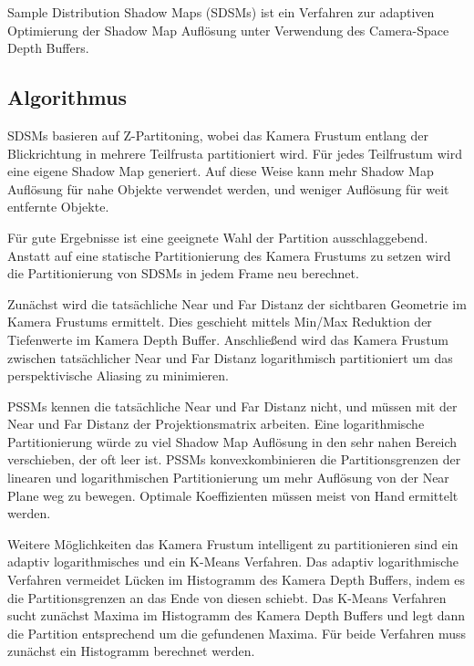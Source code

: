 \documentclass[runningheaders,a4paper]{llncs}
\begin{document}
Sample Distribution Shadow Maps (SDSMs) ist ein Verfahren zur adaptiven Optimierung der Shadow Map Auflösung unter Verwendung des Camera-Space Depth Buffers.

\subsection{Algorithmus}

SDSMs basieren auf Z-Partitoning, wobei das Kamera Frustum entlang der Blickrichtung in mehrere Teilfrusta partitioniert wird. Für jedes Teilfrustum wird eine eigene Shadow Map generiert.
Auf diese Weise kann mehr Shadow Map Auflösung für nahe Objekte verwendet werden, und weniger Auflösung für weit entfernte Objekte.

Für gute Ergebnisse ist eine geeignete Wahl der Partition ausschlaggebend.
Anstatt auf eine statische Partitionierung des Kamera Frustums zu setzen wird die Partitionierung von SDSMs in jedem Frame neu berechnet.

Zunächst wird die tatsächliche Near und Far Distanz der sichtbaren Geometrie im Kamera Frustums ermittelt. Dies geschieht mittels Min/Max Reduktion der Tiefenwerte im Kamera Depth Buffer.
Anschließend wird das Kamera Frustum zwischen tatsächlicher Near und Far Distanz logarithmisch partitioniert um das perspektivische Aliasing zu minimieren.

PSSMs kennen die tatsächliche Near und Far Distanz nicht, und müssen mit der Near und Far Distanz der Projektionsmatrix arbeiten.
Eine logarithmische Partitionierung würde zu viel Shadow Map Auflösung in den sehr nahen Bereich verschieben, der oft leer ist.
PSSMs konvexkombinieren die Partitionsgrenzen der linearen und logarithmischen Partitionierung um mehr Auflösung von der Near Plane weg zu bewegen.
Optimale Koeffizienten müssen meist von Hand ermittelt werden.

Weitere Möglichkeiten das Kamera Frustum intelligent zu partitionieren sind ein adaptiv logarithmisches und ein K-Means Verfahren.
Das adaptiv logarithmische Verfahren vermeidet Lücken im Histogramm des Kamera Depth Buffers, indem es die Partitionsgrenzen an das Ende von diesen schiebt.
Das K-Means Verfahren sucht zunächst Maxima im Histogramm des Kamera Depth Buffers und legt dann die Partition entsprechend um die gefundenen Maxima.
Für beide Verfahren muss zunächst ein Histogramm berechnet werden.
\end{document}
